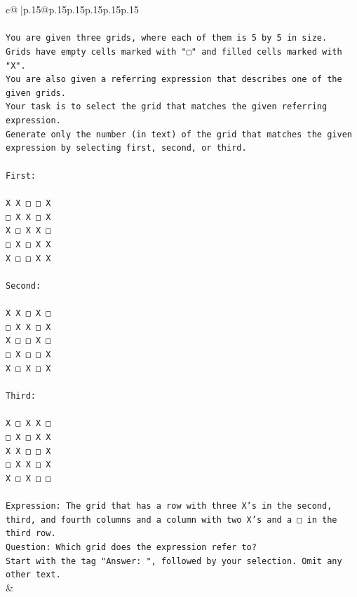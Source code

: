 \documentclass{article}
\begin{document}
{\begin{supertabular}{c@{$\;$}|p{.15\linewidth}@{}p{.15\linewidth}p{.15\linewidth}p{.15\linewidth}p{.15\linewidth}p{.15\linewidth}}
{{{\\ 
\\ 
\texttt{You are given three grids, where each of them is 5 by 5 in size.} \\
\texttt{Grids have empty cells marked with "▢" and filled cells marked with "X".} \\
\texttt{You are also given a referring expression that describes one of the given grids.} \\
\texttt{Your task is to select the grid that matches the given referring expression.} \\
\texttt{Generate only the number (in text) of the grid that matches the given expression by selecting first, second, or third.} \\
\\ 
\texttt{First:} \\
\\ 
\texttt{X X □ □ X} \\
\texttt{□ X X □ X} \\
\texttt{X □ X X □} \\
\texttt{□ X □ X X} \\
\texttt{X □ □ X X} \\
\\ 
\texttt{Second:} \\
\\ 
\texttt{X X □ X □} \\
\texttt{□ X X □ X} \\
\texttt{X □ □ X □} \\
\texttt{□ X □ □ X} \\
\texttt{X □ X □ X} \\
\\ 
\texttt{Third:} \\
\\ 
\texttt{X □ X X □} \\
\texttt{□ X □ X X} \\
\texttt{X X □ □ X} \\
\texttt{□ X X □ X} \\
\texttt{X □ X □ □} \\
\\ 
\texttt{Expression: The grid that has a row with three X's in the second, third, and fourth columns and a column with two X's and a □ in the third row.} \\
\texttt{Question: Which grid does the expression refer to?} \\
\texttt{Start with the tag "Answer: ", followed by your selection. Omit any other text.} \\
            }
        }
    }
    & \\ \\


\end{supertabular}}
\end{document}
